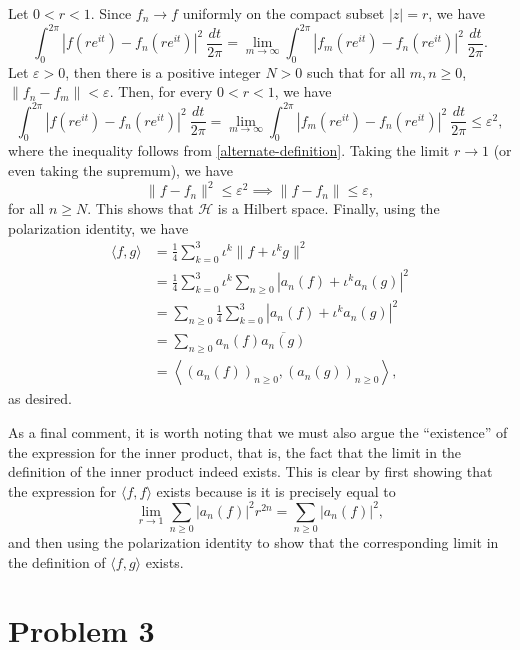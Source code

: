 \documentclass[10pt]{amsart}
\theoremstyle{thmstyle}
\theoremstyle{defstyle}
\newcommand{\calH}{\mathcal{H}} %
\renewcommand{\le}{\leqslant}
\renewcommand{\ge}{\geqslant}
\begin{document}
Let $0 < r < 1$. Since $f_n\to f$ uniformly on the compact subset $|z| = r$, we have 
\begin{equation*}
    \int_0^{2\pi} |f(re^{it}) - f_n(re^{it})|^2~\frac{dt}{2\pi} = \lim_{m\to\infty}\int_0^{2\pi}|f_m(re^{it}) - f_n(re^{it})|^2~\frac{dt}{2\pi}.
\end{equation*}
Let $\varepsilon > 0$, then there is a positive integer $N > 0$ such that for all $m,n\ge 0$, $\|f_n - f_m\| < \varepsilon$. Then, for every $0 < r < 1$, we have 
\begin{equation*}
    \int_0^{2\pi} |f(re^{it}) - f_n(re^{it})|^2~\frac{dt}{2\pi} = \lim_{m\to\infty}\int_0^{2\pi}|f_m(re^{it}) - f_n(re^{it})|^2~\frac{dt}{2\pi}\le\varepsilon^2,
\end{equation*}
where the inequality follows from \eqref{alternate-definition}. Taking the limit $r\to 1$ (or even taking the supremum), we have 
\begin{equation*}
    \|f - f_n\|^2\le\varepsilon^2\implies\|f - f_n\|\le\varepsilon,
\end{equation*}
for all $n\ge N$. This shows that $\calH$ is a Hilbert space. Finally, using the polarization identity, we have 
\begin{align*}
    \langle f, g\rangle &= \frac{1}{4}\sum_{k = 0}^3\iota^k\|f + \iota^k g\|^2 \\
    &= \frac{1}{4}\sum_{k = 0}^3\iota^k\sum_{n\ge 0}|a_n(f) + \iota^k a_n(g)|^2 \\
    &= \sum_{n\ge 0}\frac{1}{4}\sum_{k = 0}^3|a_n(f) + \iota^k a_n(g)|^2 \\
    &= \sum_{n\ge 0} a_n(f)\overline{a_n(g)} \\
    &= \left\langle\left(a_n(f)\right)_{n\ge 0}, \left(a_n(g)\right)_{n\ge 0}\right\rangle,
\end{align*}
as desired.

As a final comment, it is worth noting that we must also argue the ``existence'' of the expression for the inner product, that is, the fact that the limit in the definition of the inner product indeed exists. This is clear by first showing that the expression for $\langle f, f\rangle$ exists because is it is precisely equal to 
\begin{equation*}
    \lim_{r\to 1}\sum_{n\ge 0} |a_n(f)|^2r^{2n} = \sum_{n\ge 0}|a_n(f)|^2,
\end{equation*}
and then using the polarization identity to show that the corresponding limit in the definition of $\langle f, g\rangle$ exists.

\section{Problem 3}
\end{document}
